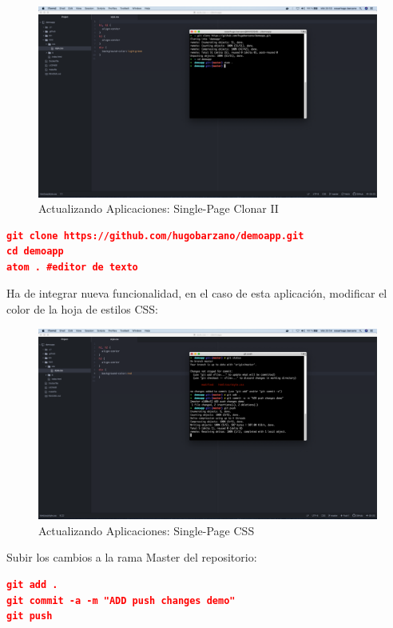 \documentclass[a4paper,11pt]{book}
\begin{document}
\begin{figure}[H]
\centering
\includegraphics[scale=0.2]{imagenes/casouso/2_4.png}
\caption{  Actualizando Aplicaciones: Single-Page Clonar II }
\end{figure}

\begin{lstlisting}[language=json,firstnumber=1]
git clone https://github.com/hugobarzano/demoapp.git
cd demoapp
atom . #editor de texto
\end{lstlisting}

 Ha de integrar nueva funcionalidad, en el caso de esta aplicación, modificar el color de la hoja de estilos CSS:
 
 \begin{figure}[H]
\centering
\includegraphics[scale=0.2]{imagenes/casouso/2_5.png}
\caption{ Actualizando Aplicaciones: Single-Page CSS   }
\end{figure}

 Subir los cambios a la rama Master del repositorio:
 
 
\begin{lstlisting}[language=json,firstnumber=1]
git add .
git commit -a -m "ADD push changes demo"
git push
\end{lstlisting}
\end{document}
